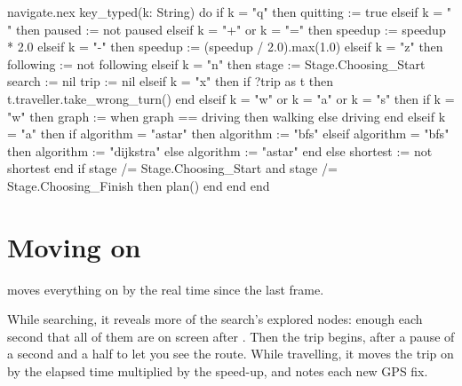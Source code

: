 \begin{continued}{navigate.nex}
  key_typed(k: String) do
    if k = "q" then
      quitting := true
    elseif k = " " then
      paused := not paused
    elseif k = "+" or k = "=" then
      speedup := speedup * 2.0
    elseif k = "-" then
      speedup := (speedup / 2.0).max(1.0)
    elseif k = "z" then
      following := not following
    elseif k = "n" then
      stage := Stage.Choosing_Start
      search := nil
      trip := nil
    elseif k = "x" then
      if ?trip as t then
        t.traveller.take_wrong_turn()
      end
    elseif k = "w" or k = "a" or k = "s" then
      if k = "w" then
        graph := when graph == driving then walking else driving end
      elseif k = "a" then
        if algorithm = "astar" then
          algorithm := "bfs"
        elseif algorithm = "bfs" then
          algorithm := "dijkstra"
        else
          algorithm := "astar"
        end
      else
        shortest := not shortest
      end
      if stage /= Stage.Choosing_Start and stage /= Stage.Choosing_Finish then
        plan()
      end
    end
  end
\end{continued}

\section{Moving on}

 moves everything on by the real time since the last frame.

While searching, it reveals more of the search's explored nodes: enough
each second that all of them are on screen after .
Then the trip begins, after a pause of a second and a half to let you see
the route. While travelling, it moves the trip on by the elapsed time
multiplied by the speed-up, and notes each new GPS fix.

